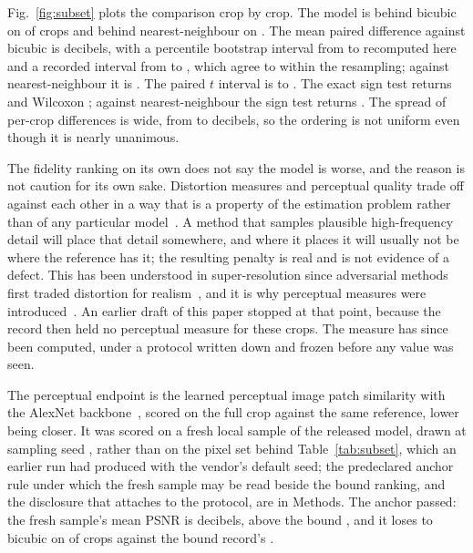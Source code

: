 Fig.~\ref{fig:subset} plots the comparison crop by crop. The model is behind
bicubic on \LossesBicubic{} of \SubsetN{} crops and behind nearest-neighbour on
\LossesNearest{}. The mean paired difference against bicubic is \GapBicubic{}
decibels, with a percentile bootstrap interval from \GapLower{} to \GapUpper{}
recomputed here and a recorded interval from \GapRecordedLower{} to
\GapRecordedUpper{}, which agree to within the resampling; against
nearest-neighbour it is \GapNearest{}. The paired $t$ interval
is \GapTLower{} to \GapTUpper{}. The exact sign test returns \GapSignP{} and
Wilcoxon \GapWilcoxP{}; against nearest-neighbour the sign test returns
\GapNearestSignP{}. The spread of per-crop differences is wide, from
\GapWorst{} to \GapBest{} decibels, so the ordering is not uniform even though it
is nearly unanimous.

The fidelity ranking on its own does not say the model is worse, and the reason
is not caution for its own sake. Distortion measures and perceptual quality
trade off against each other in a way that is a property of the estimation
problem rather than of any particular model~\cite{blau2018perception}. A method
that samples plausible high-frequency detail will place that detail somewhere,
and where it places it will usually not be where the reference has it; the
resulting penalty is real and is not evidence of a defect. This has been
understood in super-resolution since adversarial methods first traded
distortion for realism~\cite{ledig2017srgan}, and it is why perceptual measures
were introduced~\cite{zhang2018lpips}. An earlier draft of this paper stopped
at that point, because the record then held no perceptual measure for these
crops. The measure has since been computed, under a protocol written down and
frozen before any value was seen.

The perceptual endpoint is the learned perceptual image patch similarity with
the AlexNet backbone~\cite{zhang2018lpips}, scored on the full crop against the
same reference, lower being closer. It was scored on a fresh local sample of
the released model, drawn at sampling seed \LpipsSeed{}, rather than on the
pixel set behind Table~\ref{tab:subset}, which an earlier run had produced with
the vendor's default seed; the predeclared anchor rule under which the fresh
sample may be read beside the bound ranking, and the disclosure that attaches
to the protocol, are in Methods. The anchor passed: the fresh sample's
mean PSNR is \AnchorLocalPsnr{} decibels, \AnchorDeltaDb{} above the bound
\MethodPSNR{}, and it loses to bicubic on \PsnrLossesLocal{} of \SubsetN{}
crops against the bound record's \LossesBicubic{}.

